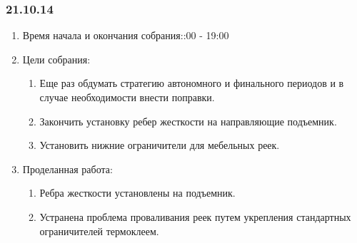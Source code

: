 	
\subsubsection{21.10.14}

\begin{enumerate}
	\item Время начала и окончания собрания::00 - 19:00
	\item Цели собрания:\newline
	\begin{enumerate}
	  \item Еще раз обдумать стратегию автономного и финального периодов и в случае необходимости внести поправки.\newline
	  
	  \item Закончить установку ребер жесткости на направляющие подъемник.\newline
	  
	  \item Установить нижние ограничители для мебельных реек.\newline
	  
    \end{enumerate}
    
	\item Проделанная работа:\newline
	\begin{enumerate}
	  \item Ребра жесткости установлены на подъемник.\newline
      
      \item Устранена проблема проваливания реек путем укрепления стандартных ограничителей термоклеем.\newline
      

\end{enumerate}
\end{enumerate}

